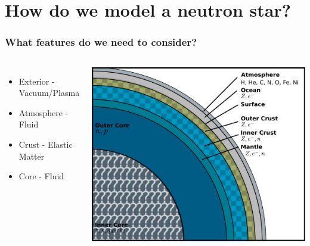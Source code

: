 \documentclass{beamer}
\begin{document}


\section{How do we model a neutron star?}
\begin{frame}
\frametitle{What features do we need to consider?}
\begin{columns}
\begin{itemize}
\item{Exterior - Vacuum/Plasma}
\item{Atmosphere - Fluid}
\item{Crust - Elastic Matter}
\item{Core - Fluid}
\end{itemize}
\includegraphics[width=\textwidth]{../images/neutron_star_structure}
\end{columns}
\end{frame}
\end{document}
